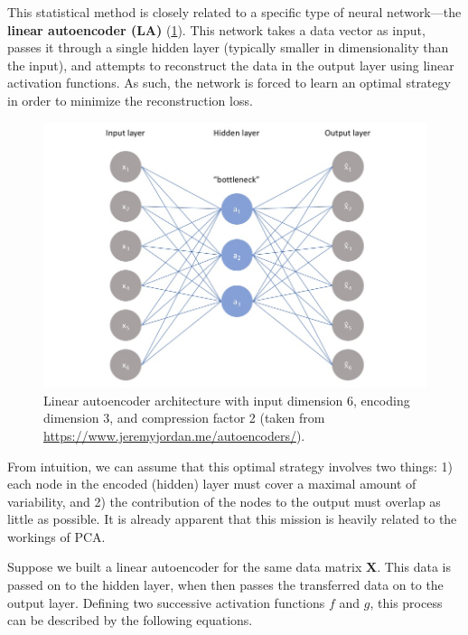 This statistical method is closely related to a specific type of neural network---the \textbf{linear autoencoder (LA)} (\ref{fig:linear_autoencoder}). This network takes a data vector as input, passes it through a single hidden layer (typically smaller in dimensionality than the input), and attempts to reconstruct the data in the output layer using linear activation functions. As such, the network is forced to learn an optimal strategy in order to minimize the reconstruction loss.

\begin{figure}[htbp]
	\begin{center}
		\includegraphics[width=\linewidth]{images/autoencoder.jpg}
		\caption{Linear autoencoder architecture with input dimension 6, encoding dimension 3, and compression factor 2 (taken from \textcolor{blue}{\url{https://www.jeremyjordan.me/autoencoders/}}).}
		\label{fig:linear_autoencoder}
	\end{center}
\end{figure}

From intuition, we can assume that this optimal strategy involves two things: 1) each node in the encoded (hidden) layer must cover a maximal amount of variability, and 2) the contribution of the nodes to the output must overlap as little as possible. It is already apparent that this mission is heavily related to the workings of PCA. 

Suppose we built a linear autoencoder for the same data matrix $\mathbf{X}$. This data is passed on to the hidden layer, when then passes the transferred data on to the output layer. Defining two successive activation functions $f$ and $g$, this process can be described by the following equations.

